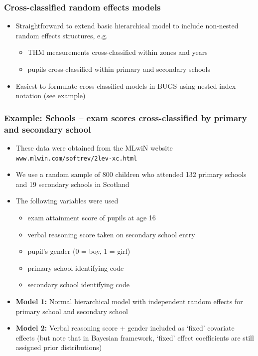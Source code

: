\documentclass{beamer}
\newcommand{\I}{\item}
\newcommand{\bibig}{\begin{itemize}}
\newcommand{\eibig}{\end{itemize}}
\begin{document}

\begin{frame}
\frametitle{Cross-classified random effects models}
\bibig
\I Straightforward to extend basic hierarchical model to include
   non-nested random effects structures, e.g.\vspace{2mm}
   \bibig
   \I THM measurements cross-classified within zones and years\vspace{1mm}
   \I pupils cross-classified within primary and secondary schools\vspace{2mm}
   \eibig
\I Easiest to formulate cross-classified models in BUGS using nested index notation
  (see example)
\eibig
\end{frame}

\begin{frame}[fragile]
\frametitle{Example: Schools -- exam scores cross-classified by primary and secondary school}
\bibig
\I These data were obtained from the MLwiN website \\
   \verb+www.mlwin.com/softrev/2lev-xc.html+\vspace{1mm}
\I We use a random sample of 800 children who attended 132 primary schools and 19 secondary schools in Scotland\vspace{1mm}
\I The following variables were used\vspace{0.5mm}
\begin{itemize}
\I[{\tt Y}] exam attainment score of pupils at age 16\vspace{0.5mm}
\I[{\tt VRQ}] verbal reasoning score taken on secondary school entry\vspace{0.5mm}
\I[{\tt SEX}] pupil's gender (0 = boy, 1 = girl)\vspace{0.5mm}
\I[{\tt PID}] primary school identifying code\vspace{0.5mm}
\I[{\tt SID}] secondary school identifying code\vspace{1mm}
\end{itemize}
\I {\bf Model 1:} Normal hierarchical model with independent random effects
   for primary school and secondary school\vspace{1mm}
\I {\bf Model 2:} Verbal reasoning score + gender included as \lq fixed' covariate effects
   (but note that in Bayesian framework, \lq fixed' effect coefficients are
   still assigned prior distributions)
\eibig
\end{frame}
\end{document}
